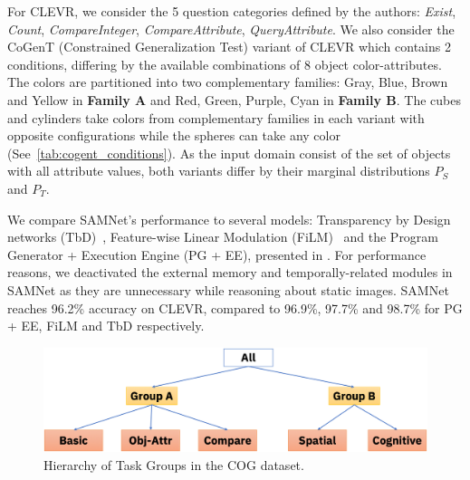 For CLEVR, we consider the 5 question categories defined by the authors: \textit{Exist}, \textit{Count}, \textit{CompareInteger}, \textit{CompareAttribute}, \textit{QueryAttribute}. We also consider the CoGenT (Constrained Generalization Test) variant of CLEVR which contains 2 conditions, differing by the available combinations of 8 object color-attributes. The colors are partitioned into two complementary families:
Gray, Blue, Brown and Yellow in \textbf{Family A} and Red, Green, Purple, Cyan in \textbf{Family B}.
The cubes and cylinders take colors from complementary families in each variant with opposite configurations while the spheres can take any color (See~\cref{tab:cogent_conditions}).
As the input domain consist of the set of objects with all attribute values, both variants differ by their marginal distributions $P_S$ and $P_T$.

We compare SAMNet's performance to several models: Transparency by Design networks (TbD)~\cite{mascharka2018transparency}, Feature-wise Linear Modulation (FiLM)~\cite{perez2018film} and the Program Generator + Execution Engine (PG + EE), presented in \cite{johnson2017inferring}. For performance reasons, we deactivated the external memory and temporally-related modules in SAMNet as they are unnecessary while reasoning about static images. SAMNet reaches 96.2\% accuracy on CLEVR, compared to 96.9\%, 97.7\% and 98.7\% for PG + EE, FiLM and TbD respectively.


\begin{figure}[htb]
	\centering
	\includegraphics[width=\columnwidth]{../img/architecture/hierarchy}
	\caption{Hierarchy of Task Groups in the COG dataset.}
	\label{fig:task-groups}
\end{figure}

